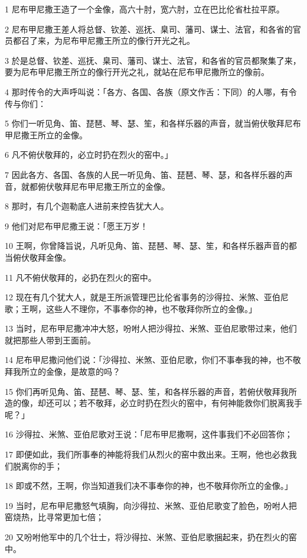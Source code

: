 \par 1 尼布甲尼撒王造了一个金像，高六十肘，宽六肘，立在巴比伦省杜拉平原。
\par 2 尼布甲尼撒王差人将总督、钦差、巡抚、臬司、藩司、谋士、法官，和各省的官员都召了来，为尼布甲尼撒王所立的像行开光之礼。
\par 3 於是总督、钦差、巡抚、臬司、藩司、谋士、法官，和各省的官员都聚集了来，要为尼布甲尼撒王所立的像行开光之礼，就站在尼布甲尼撒所立的像前。
\par 4 那时传令的大声呼叫说：「各方、各国、各族（原文作舌：下同）的人哪，有令传与你们：
\par 5 你们一听见角、笛、琵琶、琴、瑟、笙，和各样乐器的声音，就当俯伏敬拜尼布甲尼撒王所立的金像。
\par 6 凡不俯伏敬拜的，必立时扔在烈火的窑中。」
\par 7 因此各方、各国、各族的人民一听见角、笛、琵琶、琴、瑟，和各样乐器的声音，就都俯伏敬拜尼布甲尼撒王所立的金像。
\par 8 那时，有几个迦勒底人进前来控告犹大人。
\par 9 他们对尼布甲尼撒王说：「愿王万岁！
\par 10 王啊，你曾降旨说，凡听见角、笛、琵琶、琴、瑟、笙，和各样乐器声音的都当俯伏敬拜金像。
\par 11 凡不俯伏敬拜的，必扔在烈火的窑中。
\par 12 现在有几个犹大人，就是王所派管理巴比伦省事务的沙得拉、米煞、亚伯尼歌；王啊，这些人不理你，不事奉你的神，也不敬拜你所立的金像。」
\par 13 当时，尼布甲尼撒冲冲大怒，吩咐人把沙得拉、米煞、亚伯尼歌带过来，他们就把那些人带到王面前。
\par 14 尼布甲尼撒问他们说：「沙得拉、米煞、亚伯尼歌，你们不事奉我的神，也不敬拜我所立的金像，是故意的吗？
\par 15 你们再听见角、笛、琵琶、琴、瑟、笙，和各样乐器的声音，若俯伏敬拜我所造的像，却还可以；若不敬拜，必立时扔在烈火的窑中，有何神能救你们脱离我手呢？」
\par 16 沙得拉、米煞、亚伯尼歌对王说：「尼布甲尼撒啊，这件事我们不必回答你；
\par 17 即便如此，我们所事奉的神能将我们从烈火的窑中救出来。王啊，他也必救我们脱离你的手；
\par 18 即或不然，王啊，你当知道我们决不事奉你的神，也不敬拜你所立的金像。」
\par 19 当时，尼布甲尼撒怒气填胸，向沙得拉、米煞、亚伯尼歌变了脸色，吩咐人把窑烧热，比寻常更加七倍；
\par 20 又吩咐他军中的几个壮士，将沙得拉、米煞、亚伯尼歌捆起来，扔在烈火的窑中。
